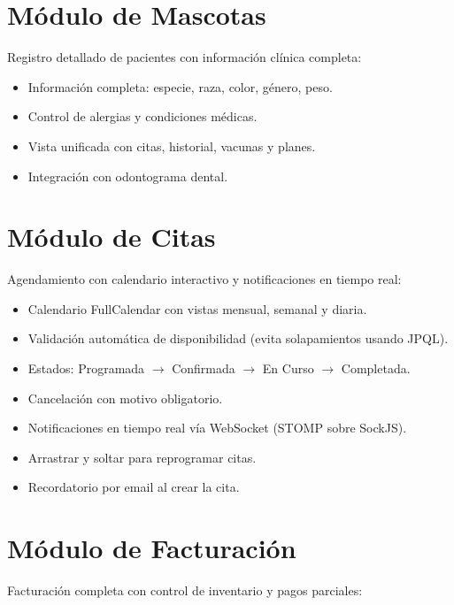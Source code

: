 \section{M\'odulo de Mascotas}

Registro detallado de pacientes con informaci\'on cl\'inica completa:

\begin{itemize}
    \item Informaci\'on completa: especie, raza, color, g\'enero, peso.
    \item Control de alergias y condiciones m\'edicas.
    \item Vista unificada con citas, historial, vacunas y planes.
    \item Integraci\'on con odontograma dental.
\end{itemize}

\section{M\'odulo de Citas}

Agendamiento con calendario interactivo y notificaciones en tiempo real:

\begin{itemize}
    \item Calendario FullCalendar con vistas mensual, semanal y diaria.
    \item Validaci\'on autom\'atica de disponibilidad (evita solapamientos usando JPQL).
    \item Estados: Programada $\rightarrow$ Confirmada $\rightarrow$ En Curso $\rightarrow$ Completada.
    \item Cancelaci\'on con motivo obligatorio.
    \item Notificaciones en tiempo real v\'ia WebSocket (STOMP sobre SockJS).
    \item Arrastrar y soltar para reprogramar citas.
    \item Recordatorio por email al crear la cita.
\end{itemize}

\section{M\'odulo de Facturaci\'on}

Facturaci\'on completa con control de inventario y pagos parciales:

